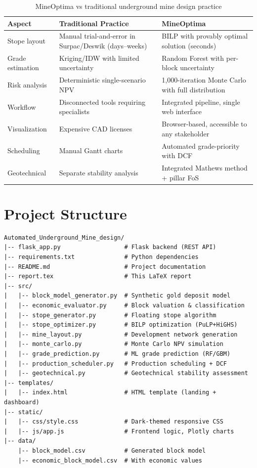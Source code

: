 \documentclass[12pt,a4paper]{article}
\begin{document}
\begin{table}[H]
\centering
\caption{MineOptima vs traditional underground mine design practice}
\small
\begin{tabular}{@{}p{3cm}p{5cm}p{5cm}@{}}
\toprule
\textbf{Aspect} & \textbf{Traditional Practice} & \textbf{MineOptima} \\
\midrule
Stope layout & Manual trial-and-error in Surpac/Deswik (days--weeks) & BILP with provably optimal solution (seconds) \\
Grade estimation & Kriging/IDW with limited uncertainty & Random Forest with per-block uncertainty \\
Risk analysis & Deterministic single-scenario NPV & 1{,}000-iteration Monte Carlo with full distribution \\
Workflow & Disconnected tools requiring specialists & Integrated pipeline, single web interface \\
Visualization & Expensive CAD licenses & Browser-based, accessible to any stakeholder \\
Scheduling & Manual Gantt charts & Automated grade-priority with DCF \\
Geotechnical & Separate stability analysis & Integrated Mathews method + pillar FoS \\
\bottomrule
\end{tabular}
\end{table}

\section{Project Structure}
\label{sec:structure}

\begin{lstlisting}[caption={Project directory structure}]
Automated_Underground_Mine_design/
|-- flask_app.py                  # Flask backend (REST API)
|-- requirements.txt              # Python dependencies
|-- README.md                     # Project documentation
|-- report.tex                    # This LaTeX report
|-- src/
|   |-- block_model_generator.py  # Synthetic gold deposit model
|   |-- economic_evaluator.py     # Block valuation & classification
|   |-- stope_generator.py        # Floating stope algorithm
|   |-- stope_optimizer.py        # BILP optimization (PuLP+HiGHS)
|   |-- mine_layout.py            # Development network generation
|   |-- monte_carlo.py            # Monte Carlo NPV simulation
|   |-- grade_prediction.py       # ML grade prediction (RF/GBM)
|   |-- production_scheduler.py   # Production scheduling + DCF
|   |-- geotechnical.py           # Geotechnical stability assessment
|-- templates/
|   |-- index.html                # HTML template (landing + dashboard)
|-- static/
|   |-- css/style.css             # Dark-themed responsive CSS
|   |-- js/app.js                 # Frontend logic, Plotly charts
|-- data/
    |-- block_model.csv           # Generated block model
    |-- economic_block_model.csv  # With economic values
\end{lstlisting}
\end{document}
